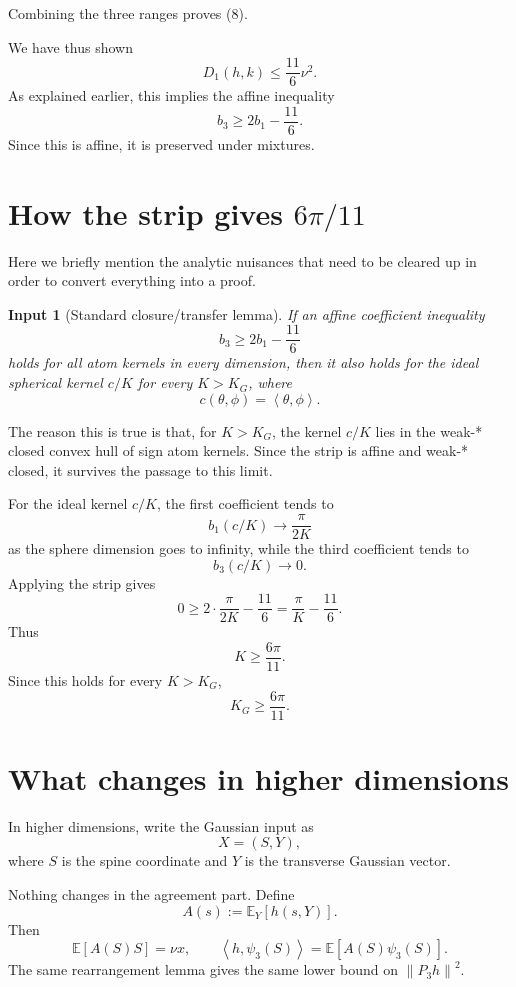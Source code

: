 \documentclass[11pt]{article}
\newtheorem{assumption}[theorem]{Input}
\newcommand{\E}{\mathbb E}
\newcommand{\ip}[2]{\left\langle #1,#2\right\rangle}
\newcommand{\norm}[1]{\left\|#1\right\|}
\begin{document}
Combining the three ranges proves (8).

We have thus shown
\[
        D_1(h,k)\le \frac{11}{6}\nu^2.
\]
As explained earlier, this implies the affine inequality
\[
        b_3 \ge 2b_1 -\frac{11}{6}.
\]
Since this is affine, it is preserved under mixtures. 

\section{How the strip gives $6\pi/11$}

Here we briefly mention the analytic nuisances that need to be cleared up in order to convert everything into a proof. 

\begin{assumption}[Standard closure/transfer lemma]
If an affine coefficient inequality
\[
        b_3\ge 2b_1-\frac{11}{6}
\]
holds for all atom kernels in every dimension, then it also holds for the ideal spherical kernel $c/K$ for every $K>K_G$, where
\[
        c(\theta,\phi)=\ip{\theta}{\phi}.
\]
\end{assumption}

The reason this is true is that, for $K>K_G$, the kernel $c/K$ lies in the weak-* closed convex hull of sign atom kernels.  Since the strip is affine and weak-* closed, it survives the passage to this limit.

For the ideal kernel $c/K$, the first coefficient tends to
\[
        b_1(c/K)\longrightarrow \frac{\pi}{2K}
\]
as the sphere dimension goes to infinity, while the third coefficient tends to
\[
        b_3(c/K)\longrightarrow 0.
\]
Applying the strip gives
\[
        0\ge 2\cdot\frac{\pi}{2K}-\frac{11}{6}
        =\frac\pi K-\frac{11}{6}.
\]
Thus
\[
        K\ge \frac{6\pi}{11}.
\]
Since this holds for every $K>K_G$,
\[
        K_G\ge \frac{6\pi}{11}.
\]


\section{What changes in higher dimensions}

In higher dimensions, write the Gaussian input as
\[
        X=(S,Y),
\]
where $S$ is the spine coordinate and $Y$ is the transverse Gaussian vector.

Nothing changes in the agreement part.  Define
\[
        A(s):=\E_Y[h(s,Y)].
\]
Then
\[
        \E[A(S)S]=\nu x,
        \qquad
        \ip{h}{\psi_3(S)}=\E[A(S)\psi_3(S)].
\]
The same rearrangement lemma gives the same lower bound on $\norm{P_3h}^2$.
\end{document}
